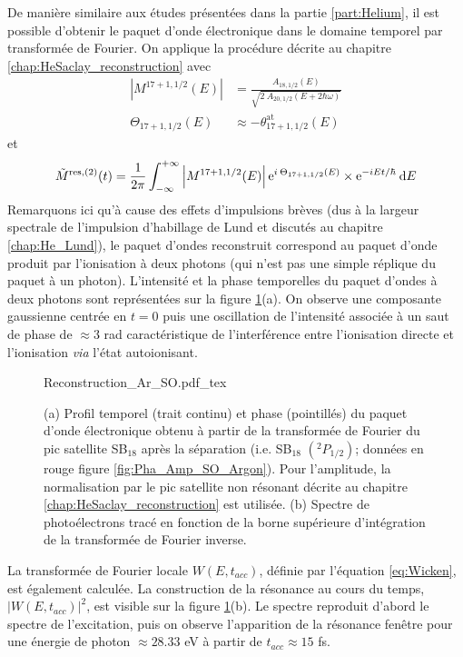 De manière similaire aux études présentées dans la partie \ref{part:Helium}, il est possible d'obtenir le paquet d'onde électronique dans le domaine temporel par transformée de Fourier. On applique la procédure décrite au chapitre \ref{chap:HeSaclay_reconstruction} avec 
\begin{align}
\left| M^{17+1,1/2}(E)\right| & = \frac{A_{18,1/2}(E)}{\sqrt{2 \: A_{20,1/2}(E + 2 \hbar \omega)}} \\ 
\Theta_{17+1,1/2} (E) & \approx - \theta^{\text{at}}_{17+1,1/2}(E)
\end{align}
et
\begin{equation}
\tilde{M}^{\text{res},(2)}(t) = \frac{1}{2 \pi} \int_{- \infty}^{+ \infty} \left| M^{17+1,1/2}(E) \right| \mathrm{e}^{i \: \Theta_{17+1,1/2} (E)} \times \mathrm{e}^{-i E t / \hbar} \: \mathrm{d} E
\end{equation}
Remarquons ici qu'à cause des effets d'impulsions brèves (dus à la largeur spectrale de l'impulsion d'habillage de Lund et discutés au chapitre \ref{chap:He_Lund}), le paquet d'ondes reconstruit correspond au paquet d'onde produit par l'ionisation à deux photons (qui n'est pas une simple réplique du paquet à un photon). L'intensité et la phase temporelles du paquet d'ondes à deux photons sont représentées sur la figure \ref{fig:Reconstruction_Ar_SO}(a). On observe une composante gaussienne centrée en $t=0$ puis une oscillation de l'intensité associée à un saut de phase de $\approx 3$ rad caractéristique de l'interférence entre l'ionisation directe et l'ionisation \textit{via} l'état autoionisant.

\begin{figure}[ht]
\centering
\def\svgwidth{0.7\textwidth}
{Reconstruction_Ar_SO.pdf_tex}
\caption{(a) Profil temporel (trait continu) et phase (pointillés) du paquet d'onde électronique obtenu à partir de la transformée de Fourier du pic satellite SB$_{18}$ après la séparation (i.e. SB$_{18}$ $(^{2}P_{1/2})$; données en rouge figure \ref{fig:Pha_Amp_SO_Argon}). Pour l'amplitude, la normalisation par le pic satellite non résonant décrite au chapitre \ref{chap:HeSaclay_reconstruction} est utilisée. (b) Spectre de photoélectrons tracé en fonction de la borne supérieure d'intégration de la transformée de Fourier inverse.}
\label{fig:Reconstruction_Ar_SO}
\end{figure}

La transformée de Fourier locale $W(E,t_{acc})$, définie par l'équation \ref{eq:Wicken}, est également calculée. La construction de la résonance au cours du temps, $|W(E,t_{acc})|^2$, est visible sur la figure \ref{fig:Reconstruction_Ar_SO}(b). Le spectre reproduit d'abord le spectre de l'excitation, puis on observe l'apparition de la résonance fenêtre pour une énergie de photon $\approx 28.33$ eV à partir de $t_{acc} \approx 15$ fs.

